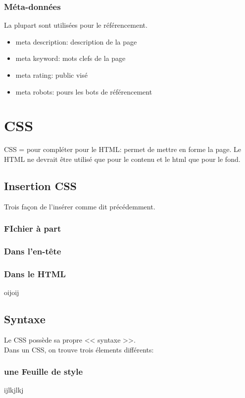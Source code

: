 \documentclass[12pt,a4paper,openany]{article}
\begin{document}
	\subsection{Méta-données}
		La plupart sont utilisées pour le référencement.
			
		\begin{itemize}
		\item meta description: description de la page
		\item meta keyword: mots clefs de la page
		\item meta rating: public visé
		\item meta robots: pours les bots de référencement
		\end{itemize}
			
	\chapter{CSS}
		CSS =  pour compléter pour le HTML: permet de mettre en forme la page.
		Le HTML ne devrait être utilisé que pour le contenu et le html que pour
		le fond.\\
		\section{Insertion CSS}	
		Trois façon de l'insérer comme dit précédemment. 
		\subsection{FIchier à part}
			
		\subsection{Dans l'en-tête}
			
		\subsection{Dans le HTML}
			
		oijoij
		\section{Syntaxe}
			Le CSS possède sa propre << syntaxe >>.\\
			Dans un CSS, on trouve trois élements différents: 
			\subsection{une Feuille de style}
			ijlkjlkj
%			
%			
\end{document}
